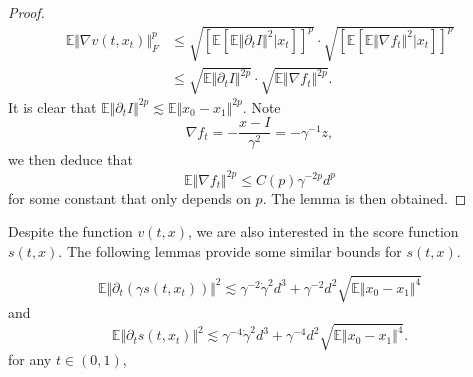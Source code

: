 \begin{proof}
    $$\begin{aligned}
        \mathbb{E}\Vert\nabla v(t,x_t)\Vert_F^p&\le\sqrt{\left[\mathbb{E}[\mathbb{E}\Vert\partial_tI\Vert^2|x_t]\right]^{p}}\cdot\sqrt{\left[\mathbb{E}[\mathbb{E}\Vert\nabla f_t\Vert^2|x_t]\right]^{p}}\\
        &\le\sqrt{\mathbb{E}\Vert\partial_tI\Vert^{2p}}\cdot\sqrt{\mathbb{E}\Vert\nabla f_t\Vert^{2p}}.
    \end{aligned}$$
    It is clear that $\mathbb{E}\Vert\partial_tI\Vert^{2p}\lesssim\mathbb{E}\Vert x_0-x_1\Vert^{2p}$. Note $$\nabla f_t=-\frac{x-I}{\gamma^2}=-\gamma^{-1}z,$$
    we then deduce that $$\mathbb{E}\Vert\nabla f_t\Vert^{2p}\le C(p)\gamma^{-2p}d^p$$
    for some constant that only depends on $p$. The lemma is then obtained.
\end{proof}

Despite the function $v(t,x)$, we are also interested in the score function $s(t,x)$. The following lemmas provide some similar bounds for $s(t,x)$.

\begin{lemma}
    $$\mathbb{E}\Vert\partial_t\left(\gamma s(t,x_t)\right)\Vert^2\lesssim\gamma^{-2}\dot{\gamma}^2d^3+\gamma^{-2}d^2\sqrt{\mathbb{E}\Vert x_0-x_1\Vert^4}$$
    and 
    $$\mathbb{E}\Vert\partial_ts(t,x_t)\Vert^2\lesssim\gamma^{-4}\dot{\gamma}^2d^3+\gamma^{-4}d^2\sqrt{\mathbb{E}\Vert x_0-x_1\Vert^4}.$$
    for any $t\in(0,1)$, 
    \label{lem:s-time}
\end{lemma}

